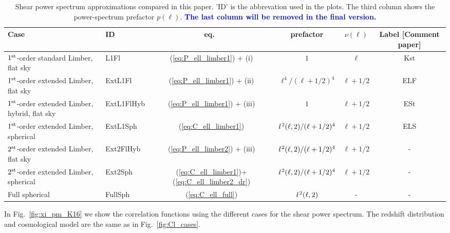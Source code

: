 \documentclass[useAMS,usenatbib]{mn2e} %
\newcommand{\ellbar}{\hbox{\it \l}\,}
\newcommand{\mk}[1]{{\bf\textcolor{blue}{#1}}}
\begin{document}
\renewcommand{\baselinestretch}{1.3}
\begin{table}[ht!]

  \label{tab:cases}

  \caption{Shear power spectrum approximations compared in this paper. 'ID' is the abbrevation used in the plots.
    The third column shows the power-spectrum prefactor $p(\ell)$.  \mk{The last column will be removed in the
        final version.}}

  \begin{tabular}{|l|l|c|c|c|c}
  \hline
  Case & ID & eq.~ & prefactor & $\nu(\ell)$ & Label [Comment paper] \\ \hline
  $1^{\rm st}$-order standard Limber, flat sky & L1Fl & (\ref{eq:P_ell_limber1}) + (i)
    & $1$ & $\ell$ & Kst \\ \hline
  $1^{\rm st}$-order extended Limber, flat sky & ExtL1Fl & (\ref{eq:P_ell_limber1}) + (ii)
    & $\ell^4/(\ell+1/2)^4$ & $\ell + 1/2$ & ELF \\ \hline
  $1^{\rm st}$-order extended Limber, hybrid, flat sky & ExtL1FlHyb & (\ref{eq:P_ell_limber1}) + (iii)
    & $1$ & $\ell + 1/2$ & ESt \\ \hline
  $1^{\rm st}$-order extended Limber, spherical & ExtL1Sph & (\ref{eq:C_ell_limber1})
    & $\ellbar^2(\ell, 2)/(\ell+1/2)^4$ & $\ell+1/2$ & ELS \\ \hline
  $2^{\rm st}$-order extended Limber, flat sky & Ext2FlHyb & (\ref{eq:P_ell_limber2}) + (iii)
    & $\ellbar^2(\ell, 2)/(\ell+1/2)^4$ & $\ell+1/2$ & - \\ \hline
  $2^{\rm st}$-order extended Limber, spherical & Ext2Sph & (\ref{eq:C_ell_limber1})+(\ref{eq:C_ell_limber2_dr})
    & $\ellbar^2(\ell, 2)/(\ell+1/2)^4$ & $\ell+1/2$ & - \\ \hline
  Full spherical & FullSph & (\ref{eq:C_ell_full}) &
      $\ellbar^2(\ell, 2)$ & - & - \\ \hline
  \end{tabular}

\end{table}
\renewcommand{\baselinestretch}{1}

In Fig.~\ref{fig:xi_pm_K16} we show the correlation functions using the different cases
for the shear power spectrum. The redshift distribution and cosmological model are the same 
as in Fig.~\ref{fig:Cl_cases}.
\end{document}
